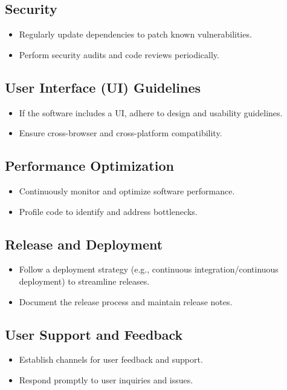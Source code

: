 \documentclass{article}
\begin{document}
\subsection{Security}
\begin{itemize}
    \item Regularly update dependencies to patch known vulnerabilities.
    \item Perform security audits and code reviews periodically.
\end{itemize}

\subsection{User Interface (UI) Guidelines}
\begin{itemize}
    \item If the software includes a UI, adhere to design and usability guidelines.
    \item Ensure cross-browser and cross-platform compatibility.
\end{itemize}

\subsection{Performance Optimization}
\begin{itemize}
    \item Continuously monitor and optimize software performance.
    \item Profile code to identify and address bottlenecks.
\end{itemize}

\subsection{Release and Deployment}
\begin{itemize}
    \item Follow a deployment strategy (e.g., continuous integration/continuous
        deployment) to streamline releases.
    \item Document the release process and maintain release notes.
\end{itemize}

\subsection{User Support and Feedback}
\begin{itemize}
    \item Establish channels for user feedback and support.
    \item Respond promptly to user inquiries and issues.
\end{itemize}
\end{document}
